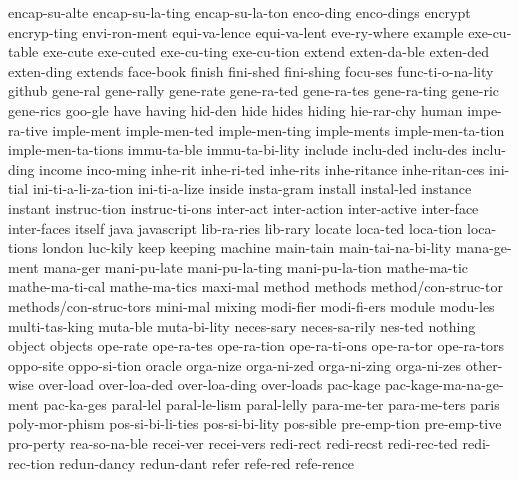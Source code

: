 {    encap-su-alte
    encap-su-la-ting
    encap-su-la-ton
    enco-ding
    enco-dings
    encrypt
    encryp-ting
    envi-ron-ment
    equi-va-lence
    equi-va-lent
    eve-ry-where
    example
    exe-cu-table
    exe-cute
    exe-cuted
    exe-cu-ting
    exe-cu-tion
    extend
    exten-da-ble
    exten-ded
    exten-ding
    extends
    face-book
    finish
    fini-shed
    fini-shing
    focu-ses
    func-ti-o-na-lity
    github
    gene-ral
    gene-rally
    gene-rate
    gene-ra-ted
    gene-ra-tes
    gene-ra-ting
    gene-ric
    gene-rics
    goo-gle
    have
    having
    hid-den
    hide
    hides
    hiding
    hie-rar-chy
    human
    impe-ra-tive
    imple-ment
    imple-men-ted
    imple-men-ting
    imple-ments
    imple-men-ta-tion
    imple-men-ta-tions
    immu-ta-ble
    immu-ta-bi-lity
    include
    inclu-ded
    inclu-des
    inclu-ding
    income
    inco-ming
    inhe-rit
    inhe-ri-ted
    inhe-rits
    inhe-ritance
    inhe-ritan-ces
    ini-tial
    ini-ti-a-li-za-tion
    ini-ti-a-lize
    inside
    insta-gram
    install
    instal-led
    instance
    instant
    instruc-tion
    instruc-ti-ons
    inter-act
    inter-action
    inter-active
    inter-face
    inter-faces
    itself
    java
    javascript
    lib-ra-ries
    lib-rary
    locate
    loca-ted
    loca-tion
    loca-tions
    london
    luc-kily
    keep
    keeping
    machine
    main-tain
    main-tai-na-bi-lity
    mana-ge-ment
    mana-ger
    mani-pu-late
    mani-pu-la-ting
    mani-pu-la-tion
    mathe-ma-tic
    mathe-ma-ti-cal
    mathe-ma-tics
    maxi-mal
    method
    methods
    method/con-struc-tor
    methods/con-struc-tors
    mini-mal
    mixing
    modi-fier
    modi-fi-ers
    module
    modu-les
    multi-tas-king
    muta-ble
    muta-bi-lity
    neces-sary
    neces-sa-rily
    nes-ted
    nothing
    object
    objects
    ope-rate
    ope-ra-tes
    ope-ra-tion
    ope-ra-ti-ons
    ope-ra-tor
    ope-ra-tors
    oppo-site
    oppo-si-tion
    oracle
    orga-nize
    orga-ni-zed
    orga-ni-zing
    orga-ni-zes
    other-wise
    over-load
    over-loa-ded
    over-loa-ding
    over-loads
    pac-kage
    pac-kage-ma-na-ge-ment
    pac-ka-ges
    paral-lel
    paral-le-lism
    paral-lelly
    para-me-ter
    para-me-ters
    paris
    poly-mor-phism
    pos-si-bi-li-ties
    pos-si-bi-lity
    pos-sible
    pre-emp-tion
    pre-emp-tive
    pro-perty
    rea-so-na-ble
    recei-ver
    recei-vers
    redi-rect
    redi-recst
    redi-rec-ted
    redi-rec-tion
    redun-dancy
    redun-dant
    refer
    refe-red
    refe-rence
}
